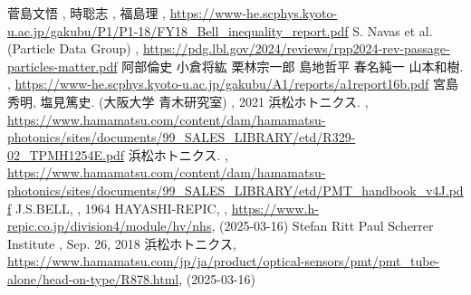\documentclass[../../main.tex]{subfiles}
\numberwithin{equation}{section}
\numberwithin{table}{section}
\numberwithin{figure}{section}
\begin{document}
  \begin{thebibliography}{99}
    菅島文悟 , 時聡志 , 福島理
      \newblock , \url{https://www-he.scphys.kyoto-u.ac.jp/gakubu/P1/P1-18/FY18_Bell_inequality_report.pdf}
      S. Navas et al. (Particle Data Group)
      \newblock , \url{https://pdg.lbl.gov/2024/reviews/rpp2024-rev-passage-particles-matter.pdf}
      阿部倫史 小倉将紘 栗林宗一郎  島地哲平 春名純一 山本和樹.
      \newblock , \url{https://www-he.scphys.kyoto-u.ac.jp/gakubu/A1/reports/a1report16b.pdf}
      宮島秀明, 塩見篤史. (大阪大学 青木研究室)
      \newblock , 2021
      浜松ホトニクス.
      \newblock , \url{https://www.hamamatsu.com/content/dam/hamamatsu-photonics/sites/documents/99_SALES_LIBRARY/etd/R329-02_TPMH1254E.pdf}
      浜松ホトニクス.
      \newblock , \url{https://www.hamamatsu.com/content/dam/hamamatsu-photonics/sites/documents/99_SALES_LIBRARY/etd/PMT_handbook_v4J.pdf}
      J.S.BELL,
      \newblock, 1964
      HAYASHI-REPIC, , \url{https://www.h-repic.co.jp/division4/module/hv/nhs}, (2025-03-16)
      Stefan Ritt
      Paul Scherrer Institute
      \newblock, Sep. 26, 2018
      浜松ホトニクス, 
      \newblock \url{https://www.hamamatsu.com/jp/ja/product/optical-sensors/pmt/pmt_tube-alone/head-on-type/R878.html}, (2025-03-16)

  \end{thebibliography}
\end{document}

